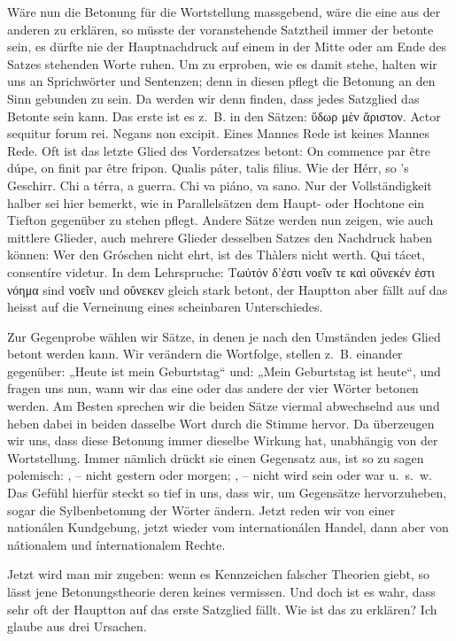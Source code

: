 Wäre nun die Betonung für die Wortstellung massgebend, wäre die eine aus der anderen zu erklären, so müsste der voranstehende Satztheil immer der betonte sein, es dürfte nie der Hauptnachdruck auf einem in der Mitte oder am Ende des Satzes stehenden Worte ruhen. Um zu erproben, wie es damit stehe, halten wir uns an Sprichwörter und Sentenzen; denn in diesen pflegt die Betonung an den Sinn gebunden zu sein. Da werden wir denn finden, dass jedes Satzglied das Betonte sein kann. Das erste ist es z.~B. in den Sätzen: ὕδωρ μὲν ἄριστον. Actor sequitur forum rei. Negans non excipit. Eines Mannes Rede ist keines Mannes Rede. Oft ist das letzte Glied des Vordersatzes betont: On commence par être dúpe, on finit par être fripon. Qualis páter, talis filius. Wie der Hérr, so ’s Geschirr. Chi a térra, a guerra. Chi va piáno, va sano. Nur der Vollständigkeit halber sei hier bemerkt, wie in Parallelsätzen dem Haupt- oder Hochtone ein Tiefton gegenüber zu stehen pflegt. Andere Sätze werden \label{sp.375} nun zeigen, wie auch mittlere Glieder, auch mehrere \label{fp.359} Glieder desselben Satzes den Nachdruck haben können: Wer den Gróschen nicht ehrt, ist des Thàlers nicht werth. Qui tácet, consentíre videtur. In dem Lehrspruche: Τωὐτόν δ’ἐστι νοεῖν τε καὶ οὕνεκέν ἐστι νόημα sind νοεῖν und οὕνεκεν gleich stark betont, der Hauptton aber fällt auf  das heisst auf die Verneinung eines scheinbaren Unterschiedes.

Zur Gegenprobe wählen wir Sätze, in denen je nach den Umständen jedes Glied betont werden kann. Wir verändern die Wortfolge, stellen z.~B. einander gegenüber: „Heute ist mein Geburtstag“ und: „Mein Geburtstag ist heute“, und fragen uns nun, wann wir das eine oder das andere der vier Wörter betonen werden. Am Besten sprechen wir die beiden Sätze viermal abwechselnd aus und heben dabei in beiden dasselbe Wort durch die Stimme hervor. Da überzeugen wir uns, dass diese Betonung immer dieselbe Wirkung hat, unabhängig von der Wortstellung. Immer nämlich drückt sie einen Gegensatz aus, ist so zu sagen polemisch: , – nicht gestern oder morgen; , – nicht wird sein oder war u.~s.~w. Das Gefühl hierfür steckt so tief in uns, dass wir, um Gegensätze hervorzuheben, sogar die Sylbenbetonung der Wörter ändern. Jetzt reden wir von einer nationálen Kundgebung, jetzt wieder vom internationálen Handel, dann aber von nátionalem und ínternationalem Rechte.

Jetzt wird man mir zugeben: wenn es Kennzeichen falscher Theorien giebt, so lässt jene Betonungstheorie deren keines vermissen. Und doch ist es wahr, dass sehr oft der Hauptton auf das erste Satzglied fällt. Wie ist das zu erklären? Ich glaube aus drei Ursachen.

